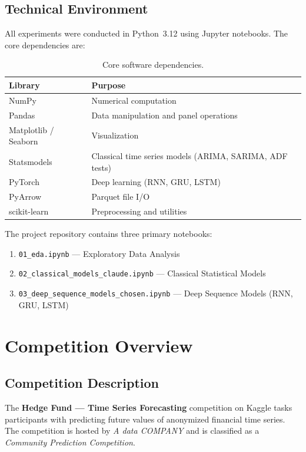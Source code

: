 \section{Technical Environment}

All experiments were conducted in Python~3.12 using Jupyter notebooks. The core dependencies are:

\begin{table}[H]
\centering
\caption{Core software dependencies.}
\label{tab:dependencies}
\begin{tabular}{ll}
\toprule
\textbf{Library} & \textbf{Purpose} \\
\midrule
NumPy & Numerical computation \\
Pandas & Data manipulation and panel operations \\
Matplotlib / Seaborn & Visualization \\
Statsmodels & Classical time series models (ARIMA, SARIMA, ADF tests) \\
PyTorch & Deep learning (RNN, GRU, LSTM) \\
PyArrow & Parquet file I/O \\
scikit-learn & Preprocessing and utilities \\
\bottomrule
\end{tabular}
\end{table}

The project repository contains three primary notebooks:
\begin{enumerate}
    \item \texttt{01\_eda.ipynb} --- Exploratory Data Analysis
    \item \texttt{02\_classical\_models\_claude.ipynb} --- Classical Statistical Models
    \item \texttt{03\_deep\_sequence\_models\_chosen.ipynb} --- Deep Sequence Models (RNN, GRU, LSTM)
\end{enumerate}


\chapter{Competition Overview}
\label{ch:competition}

\section{Competition Description}

The \textbf{Hedge Fund --- Time Series Forecasting} competition on Kaggle tasks participants with predicting future values of anonymized financial time series. The competition is hosted by \emph{A data COMPANY} and is classified as a \emph{Community Prediction Competition}.

